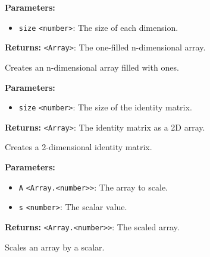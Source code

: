 \documentclass[12pt,a4paper]{article}
\begin{document}
\vspace{5mm}
\noindent {}


\noindent \textbf{Parameters:}
\begin{itemize}
  \item \texttt{size} \texttt{<number>}: The size of each dimension.
\end{itemize}

\noindent \textbf{Returns:} \texttt{<Array>}: The one-filled n-dimensional array.

\noindent Creates an n-dimensional array filled with ones.

\vspace{5mm}
\noindent {}


\noindent \textbf{Parameters:}
\begin{itemize}
  \item \texttt{size} \texttt{<number>}: The size of the identity matrix.
\end{itemize}

\noindent \textbf{Returns:} \texttt{<Array>}: The identity matrix as a 2D array.

\noindent Creates a 2-dimensional identity matrix.

\vspace{5mm}
\noindent {}


\noindent \textbf{Parameters:}
\begin{itemize}
  \item \texttt{A} \texttt{<Array.<number>>}: The array to scale.
  \item \texttt{s} \texttt{<number>}: The scalar value.
\end{itemize}

\noindent \textbf{Returns:} \texttt{<Array.<number>>}: The scaled array.

\noindent Scales an array by a scalar.

\vspace{5mm}
\noindent {}
\end{document}
